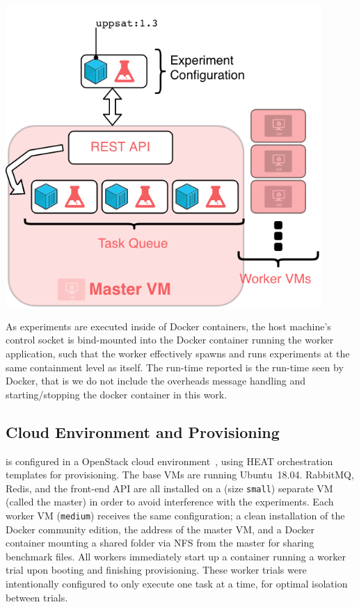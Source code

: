 \documentclass[a4paper]{IEEEtran}
\begin{document}
\begin{Figure}
  \centering
  \includegraphics[width=0.9\textwidth]{architecture}
  \label{fig:architecture}
\end{Figure}

\vspace{5em}
As experiments are executed inside of Docker containers, the host
machine's control socket is bind-mounted into the Docker container
running the worker application, such that the worker effectively
spawns and runs experiments at the same containment level as
itself. The run-time reported is the run-time seen by Docker, that is we
do not include the overheads message handling and starting/stopping
the docker container in this work.

\subsection{Cloud Environment and Provisioning}

\testbench{} is configured in a OpenStack cloud environment~\cite{openstack},
using HEAT orchestration templates for provisioning. The base VMs are running
Ubuntu~18.04. RabbitMQ, Redis, and the front-end API are all installed
on a (size \texttt{small}) separate VM (called the master) in order to avoid
interference with the experiments. Each worker VM (\texttt{medium}) receives the
same configuration; a clean installation of the Docker community edition, the
address of the master VM, and a Docker container mounting a shared folder via
NFS from the master for sharing benchmark files. All workers immediately start
up a container running a worker trial upon booting and finishing
provisioning. These worker trials were intentionally configured to only
execute one task at a time, for optimal isolation between trials.
\end{document}
